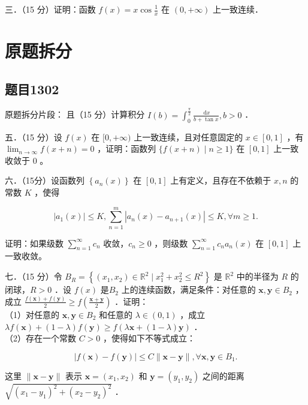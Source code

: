 \documentclass{article}
\begin{document}
三．（15 分）证明：函数 \(f(x)=x \cos \frac{1}{x}\) 在 \((0,+\infty)\) 上一致连续．\\

\section{原题拆分}
\subsection{题目1302}
原题拆分片段：
且（15 分）计算积分 \(I(b)=\int_{0}^{\frac{\pi}{2}} \frac{\mathrm{~d} x}{b+\tan x}, b>0\) ．

五．（15 分）设 \(f(x)\) 在 \([0,+\infty)\) 上一致连续，且对任意固定的 \(x \in[0,1]\) ，有 \(\lim _{n \rightarrow \infty} f(x+n)=0\) ，证明：函数列 \(\{f(x+n) \mid n \geq 1\}\) 在 \([0,1]\) 上一致收敛于 0 。

六．（15分）设函数列 \(\left\{a_{n}(x)\right\}\) 在 \([0,1]\) 上有定义，且存在不依赖于 \(x, n\) 的常数 \(K\) ，使得

\[
\left|a_{1}(x)\right| \leq K, \sum_{n=1}^{m}\left|a_{n}(x)-a_{n+1}(x)\right| \leq K, \forall m \geq 1 .
\]

证明：如果级数 \(\sum_{n=1}^{\infty} c_{n}\) 收敛，\(c_{n} \geq 0\) ，则级数 \(\sum_{n=1}^{\infty} c_{n} a_{n}(x)\) 在 \([0,1]\) 上一致收敛。

七．（15 分）令 \(B_{R}=\left\{\left(x_{1}, x_{2}\right) \in \mathbb{R}^{2} \mid x_{1}^{2}+x_{2}^{2} \leq R^{2}\right\}\) 是 \(\mathbb{R}^{2}\) 中的半径为 \(R\) 的闭球，\(R>0\) ．设 \(f(x)\) 是\(B_{2}\) 上的连续函数，满足条件：对任意的 \(\mathbf{x}, \mathbf{y} \in B_{2}\) ，成立 \(\frac{f(\mathbf{x})+f(\mathbf{y})}{2} \geq f\left(\frac{\mathbf{x}+\mathbf{y}}{2}\right)\) ．证明：\\
（1）对任意的 \(\mathbf{x}, \mathbf{y} \in B_{2}\) 和任意的 \(\lambda \in(0,1)\) ，成立 \(\lambda f(\mathbf{x})+(1-\lambda) f(\mathbf{y}) \geq f(\lambda \mathbf{x}+(1-\lambda) \mathbf{y})\) ．\\
（2）存在一个常数 \(C>0\) ，使得如下不等式成立：

\[
|f(\mathbf{x})-f(\mathbf{y})| \leq C\|\mathbf{x}-\mathbf{y}\|, \forall \mathbf{x}, \mathbf{y} \in B_{1} .
\]

这里 \(\|\mathbf{x}-\mathbf{y}\|\) 表示 \(\mathbf{x}=\left(x_{1}, x_{2}\right)\) 和 \(\mathbf{y}=\left(y_{1}, y_{2}\right)\) 之间的距离 \(\sqrt{\left(x_{1}-y_{1}\right)^{2}+\left(x_{2}-y_{2}\right)^{2}}\) ．
\end{document}
